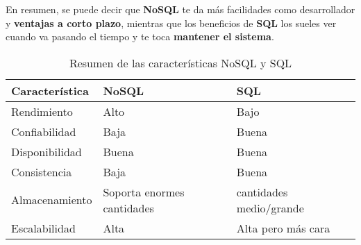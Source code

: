 En resumen, se puede decir que \textbf{NoSQL} te da más facilidades como desarrollador y \textbf{ventajas a corto plazo}, mientras que los beneficios de \textbf{SQL} los sueles ver cuando va pasando el tiempo y te toca \textbf{mantener el sistema}.

\vspace{1cm}

\begin{table}[H]
	\centering
	\begin{tabular}[c]{|l |l |l|}
		\hline
		\rowcolor{azulOscuro} \color{white}Característica & \color{white}NoSQL & \color{white}SQL \\
		\hline
		\cellcolor{azulClaro} Rendimiento & \cellcolor{verdeSuave}Alto & \cellcolor{rojoSuave}Bajo \\
		\cellcolor{azulClaro}Confiabilidad & \cellcolor{rojoSuave}Baja & \cellcolor{verdeSuave}Buena \\
		\cellcolor{azulClaro}Disponibilidad & \cellcolor{verdeSuave}Buena & \cellcolor{verdeSuave}Buena \\
		\cellcolor{azulClaro}Consistencia & \cellcolor{rojoSuave}Baja & \cellcolor{verdeSuave}Buena \\
		\cellcolor{azulClaro}Almacenamiento & \cellcolor{verdeSuave}Soporta enormes cantidades & \cellcolor{amarilloSuave}cantidades medio/grande \\
		\cellcolor{azulClaro}Escalabilidad & \cellcolor{verdeSuave}Alta & \cellcolor{amarilloSuave}Alta pero más cara \\
		\hline
	
	\end{tabular}
	\caption{Resumen de las características NoSQL y SQL}
\end{table}


\newpage